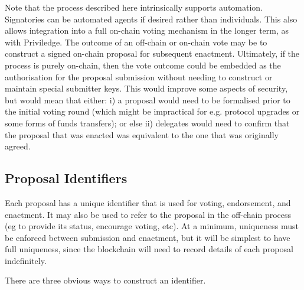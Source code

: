 
Note that the process described here intrinsically supports automation.  Signatories can be automated agents if desired rather than individuals.  This also allows integration into a full on-chain voting mechanism in the longer term, as with Priviledge.  The outcome of an off-chain or on-chain vote may be to construct a signed on-chain proposal for subsequent enactment.  Ultimately, if the process is purely on-chain, then the vote outcome could be embedded as the authorisation for the proposal submission without needing to construct or maintain special submitter keys.  This would improve some aspects of security, but would mean that either: i) a proposal would need to be formalised prior to the initial voting round (which might be impractical for e.g. protocol upgrades or some forms of funds transfers); or else ii) delegates would need to confirm that the proposal that was enacted was equivalent to the one that was originally agreed.


\subsection{Proposal Identifiers}
\label{sect:proposalid}

Each proposal has a unique identifier that is used for voting, endorsement, and enactment.  It may also be used to refer to the proposal in the off-chain process (eg to provide its
status, encourage voting, etc).  At a minimum, uniqueness must be enforced between submission and enactment, but it will be simplest to have full uniqueness, since the blockchain will need to record
details of each proposal indefinitely.

There are three obvious ways to construct an identifier.

